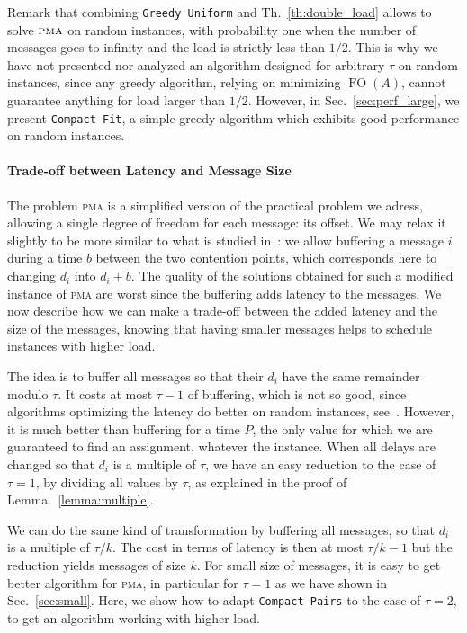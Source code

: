 \documentclass[a4paper,UKenglish,cleveref, autoref, thm-restate]{lipics-v2019}
\DeclareMathOperator{\Fo}{FO}
\newcommand\pma{\textsc{pma}\xspace}
\newcommand\compactpair{\texttt{Compact Pairs}\xspace}
\newcommand\greedyuniform{\texttt{Greedy Uniform}\xspace}
\newcommand\compactfit{\texttt{Compact Fit}\xspace}
\begin{document}
Remark that combining \greedyuniform and Th.~\ref{th:double_load} allows to solve $\pma$ on random instances, with probability one when the number of messages goes to infinity and the load is strictly less than $1/2$. This is why we have not presented nor analyzed an algorithm designed for arbitrary $\tau$ on random instances, since any greedy algorithm, relying on minimizing $\Fo(A)$, cannot guarantee anything for load larger than $1/2$. However, in Sec.~\ref{sec:perf_large}, we present \compactfit, a simple greedy algorithm which exhibits good performance on random instances.

\paragraph*{Trade-off between Latency and Message Size}

The problem \pma is a simplified version of the practical problem we adress, allowing a single degree of freedom for each message: its offset. We may relax it slightly to be more similar to what is studied in~\cite{barth2018deterministic}: we allow buffering a message $i$ during a time $b$ between the two contention points, which corresponds here to changing $d_i$ into $d_i + b$. The quality of the solutions obtained for such a modified instance of \pma are worst since the buffering adds latency to the messages. We now describe how we can make a trade-off between the added latency and the size of the messages, knowing that having smaller messages helps to schedule instances with higher load.

The idea is to buffer all messages so that their $d_i$ have the same
remainder modulo $\tau$. It costs at most $\tau - 1$ of buffering, which is not
so good, since algorithms optimizing the latency do better on random instances, see~\cite{barth2018deterministic}. However, it is much better than buffering for a time $P$, the only value for which we are guaranteed to find an assignment, whatever the instance. When all delays are changed so that $d_i$ is a multiple of $\tau$, we have an easy reduction to the case of $\tau = 1$, by dividing all values by $\tau$, as explained in the proof of Lemma.~\ref{lemma:multiple}.


We can do the same kind of transformation by buffering all messages, so that $d_i$ is a multiple of $\tau / k$. The cost in terms of latency is then at most $\tau / k - 1$ but the reduction yields messages of size $k$. For small size of messages, it is easy to get better algorithm for \pma, in particular for $\tau = 1$ as we have shown in Sec.~\ref{sec:small}. Here, we show how to adapt \compactpair to the case of $\tau = 2$, to get an algorithm working with higher load.
\end{document}
